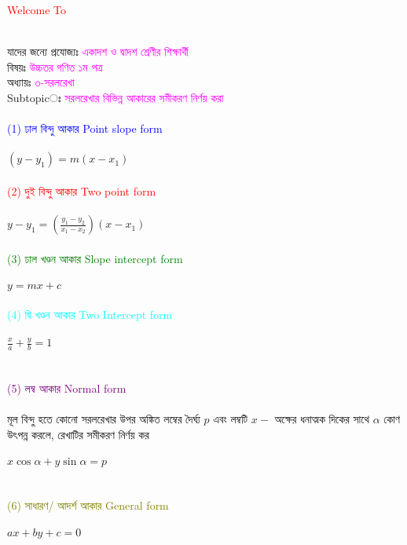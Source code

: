\documentclass{article}
\begin{document}
 
	\Large
	\textcolor{red}{Welcome To} 
	\\
	\\
	যাদের জন্যে প্রযোজ্যঃ  	\textcolor{magenta}{একাদশ ও দ্বাদশ শ্রেণীর শিক্ষার্থী} \\
	বিষয়ঃ \textcolor{magenta}{উচ্চতর গণিত ১ম পত্র} \\
	অধ্যায়ঃ \textcolor{magenta}{৩-সরলরেখা}\\ 
	Subtopicঃ  \textcolor{magenta}{  সরলরেখার বিভিন্ন আকারের সমীকরণ নির্ণয় করা   }\\
	\\
	\textcolor{blue}{(1)	ঢাল বিন্দু আকার Point slope form}\\
	\\
	$(y-y_1)=m(x-x_1)$\\
	\\
	\textcolor{red} {(2)  দুই বিন্দু আকার 	Two point form}\\
	\\
	$y-y_1=\left(\frac{y_1-y_2}{x_1-x_2}\right)(x-x_1)$\\
	\\
	\textcolor{green}{ (3) ঢাল খণ্ডন আকার 	Slope intercept form}\\
	\\
	$y=mx+c$\\
	\\
	\textcolor{cyan}{ (4) দ্বি খণ্ডন আকার  Two	Intercept form}\\
	\\
	$\frac{x}{a}+\frac{y}{b}=1$\\
	\\
	\\
	\textcolor{purple}{ (5) লম্ব  আকার  Normal form}\\
	\\
	মূল বিন্দু হতে কোনো সরলরেখার উপর অঙ্কিত লম্বের দৈর্ঘ্য $p$ এবং লম্বটি $x-$ অক্ষের ধনাত্মক দিকের সাথে $\alpha$ কোণ উৎপন্ন করলে, রেখাটির সমীকরণ নির্ণয় কর \\ 
	\\
	$x\cos \alpha +y\sin \alpha=p$\\
	\\
	\\
	\textcolor{olive}{ (6) সাধারণ/ আদর্শ  আকার  General form}\\
	\\
		$ax+by+c=0$\\
\end{document}
